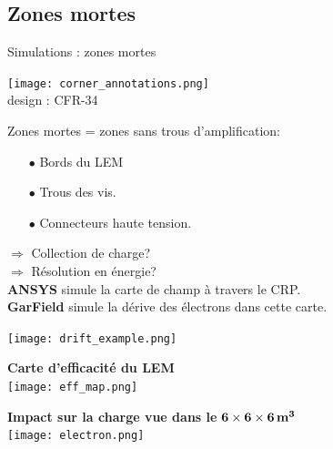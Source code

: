   \subsection{Zones mortes}
    
    \begin{frame}{Simulations : zones mortes}
    	\begin{scriptsize}
    		\begin{minipage}{0.38\textwidth}
    			\begin{center}
    				\texttt{[image: corner\_annotations.png]}\\
    				design : CFR-34\\
    			\end{center} 
    			Zones mortes = zones sans trous d'amplification:
    			\begin{itemize}
    				\item[$\bullet$] Bords du LEM
    				\item[$\bullet$] Trous des vis.
    				\item[$\bullet$] Connecteurs haute tension.
    			\end{itemize}
    			$\Rightarrow$ Collection de charge?\\
    			$\Rightarrow$ Résolution en énergie?\\
    			
    			\textbf{ANSYS} simule la carte de champ à travers le CRP.\\
    			\textbf{GarField} simule la dérive des électrons dans cette carte.\\
    		\end{minipage}
    		\begin{minipage}{0.58\textwidth}
    			\centering
    			\texttt{[image: drift\_example.png]}\\
    			\vspace{0.5cm} \hspace{0.1cm}
    			\begin{minipage}{0.48\textwidth}
    				\centering
    				\textbf{Carte d'efficacité du LEM}\\
    				\texttt{[image: eff\_map.png]}
    			\end{minipage}\hfill
    			\begin{minipage}{0.48\textwidth}
    				\centering
    				\textbf{Impact sur la charge vue dans le} $\mathbf{6 \times 6 \times 6} \,\textbf{\si[detect-weight]{\meter\cubed}}$\\
    				\texttt{[image: electron.png]}
    			\end{minipage}
    		\end{minipage}
    	\end{scriptsize} 
    \end{frame}

